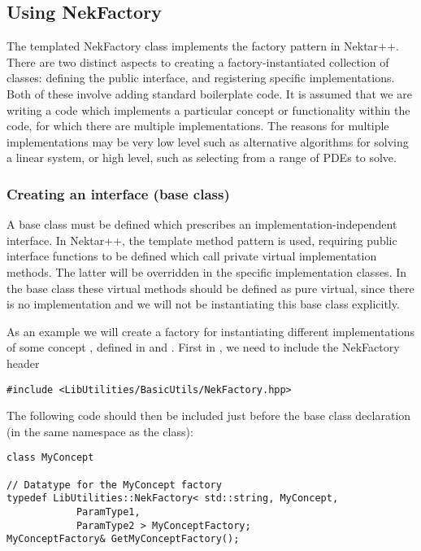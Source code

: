 
\subsection{Using NekFactory}
The templated NekFactory class implements the factory pattern in Nektar++.
There are two distinct aspects to creating a factory-instantiated collection of
classes: defining the public interface, and registering specific
implementations. Both of these involve adding standard boilerplate code. It is
assumed that we are writing a code which implements a particular concept or
functionality within the code, for which there are multiple implementations. The
reasons for multiple implementations may be very low level such as alternative
algorithms for solving a linear system, or high level, such as selecting from a
range of PDEs to solve.

\subsubsection{Creating an interface (base class)}
A base class must be defined which prescribes an implementation-independent
interface. In Nektar++, the template method pattern is used, requiring public
interface functions to be defined which call private virtual implementation
methods. The latter will be overridden in the specific implementation classes.
In the base class these virtual methods should be defined as pure virtual, since
there is no implementation and we will not be instantiating this base class
explicitly.

As an example we will create a factory for instantiating different
implementations of some concept , defined in
 and . First in ,
we need to include the NekFactory header

\begin{lstlisting}[style=C++Style]
#include <LibUtilities/BasicUtils/NekFactory.hpp>
\end{lstlisting}

The following code should then be included just before the base class
declaration (in the same namespace as the class):

\begin{lstlisting}[style=C++Style]
class MyConcept

// Datatype for the MyConcept factory
typedef LibUtilities::NekFactory< std::string, MyConcept, 
            ParamType1,
            ParamType2 > MyConceptFactory;
MyConceptFactory& GetMyConceptFactory();
\end{lstlisting}

